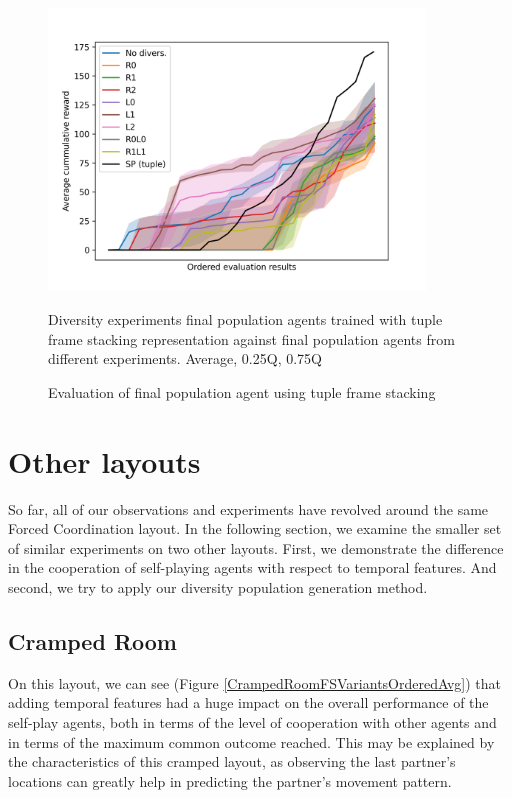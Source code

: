 \begin{figure}[!ht]
    \centering
    \includegraphics*[width=10cm]{../img/FinalPopFinalPopFsTupleAvg.png}

    \caption{Evaluation of final population agent using tuple frame stacking}
    \label{FinalPopFinalPopFsTupleAvg}
    \medskip
    \small 
    Diversity experiments final population agents trained with tuple frame stacking representation against final population agents from different experiments.
    Average, 0.25Q, 0.75Q

\end{figure}

\newpage

\section{Other layouts}
So far, all of our observations and experiments have revolved around the same Forced Coordination layout.
In the following section, we examine the smaller set of similar experiments on two other layouts.
First, we demonstrate the difference in the cooperation of self-playing agents with respect to temporal features.
And second, we try to apply our diversity population generation method.



\subsection{Cramped Room}
On this layout, we can see (Figure \ref{CrampedRoomFSVariantsOrderedAvg}) that adding temporal features had a huge impact on the overall performance of the self-play agents, both in terms of the level of cooperation with other agents and in terms of the maximum common outcome reached.
This may be explained by the characteristics of this cramped layout, as observing the last partner's locations can greatly help in predicting the partner's movement pattern.

